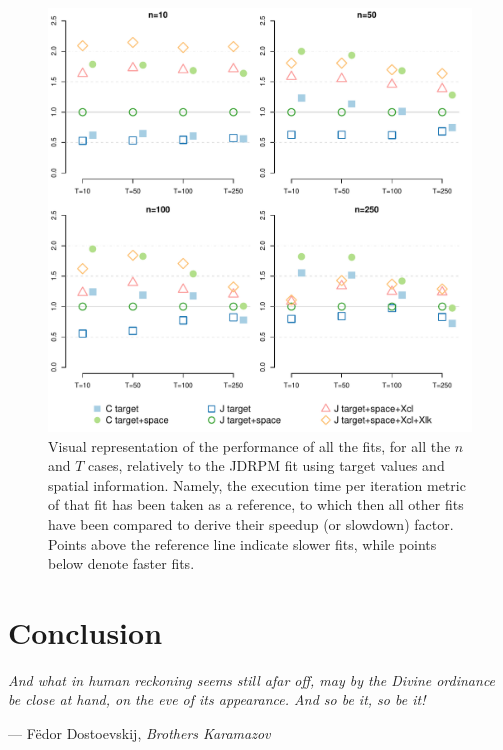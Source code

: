 \documentclass[12pt,	%
	a4paper,		%
	twoside,		%
	openright,		%
	titlepage,%
	]{book}
\theoremstyle{definition}
\begin{document}
\begin{figure}[!ht]
    \centering
    \includegraphics[width=1\linewidth]{Testing/Scaling possibilities/summary_performance_higher.pdf}
    \caption[Visual representation of all fitting performances]{Visual representation of the performance of all the fits, for all the $n$ and $T$ cases, relatively to the JDRPM fit using target values and spatial information. Namely, the execution time per iteration metric of that fit has been taken as a reference, to which then all other fits have been compared to derive their speedup (or slowdown) factor. Points above the reference line indicate slower fits, while points below denote faster fits.}
    \label{fig: summary performance scaling}
\end{figure} 


\chapter{Conclusion}
\label{chap: conclusion}

\setlength{}
\epigraph{\itshape
And what in human reckoning seems still afar off, may by the Divine ordinance be close at hand, on the eve of its appearance. And so be it, so be it!
}{--- F\"{e}dor Dostoevskij, \textit{Brothers Karamazov}}
\setlength{}
\end{document}

